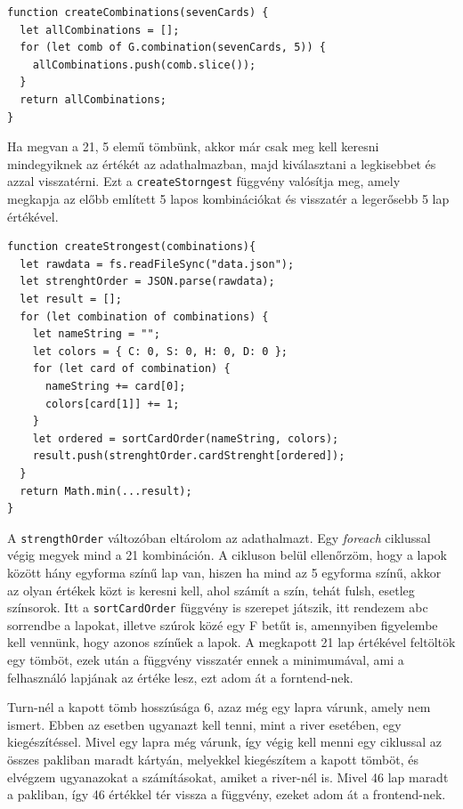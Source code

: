 \newpage

\begin{lstlisting}[style=htmlcssjs]
function createCombinations(sevenCards) {
  let allCombinations = [];
  for (let comb of G.combination(sevenCards, 5)) {
    allCombinations.push(comb.slice());
  }
  return allCombinations;
}
\end{lstlisting}

Ha megvan a 21, 5 elemű tömbünk, akkor már csak meg kell keresni mindegyiknek az értékét az adathalmazban, majd kiválasztani a legkisebbet és azzal visszatérni. Ezt a \texttt{createStorngest} függvény valósítja meg, amely megkapja az előbb említett 5 lapos kombinációkat és visszatér a legerősebb 5 lap értékével.

\begin{lstlisting}[style=htmlcssjs]
function createStrongest(combinations){
  let rawdata = fs.readFileSync("data.json");
  let strenghtOrder = JSON.parse(rawdata);
  let result = [];
  for (let combination of combinations) {
    let nameString = "";
    let colors = { C: 0, S: 0, H: 0, D: 0 };
    for (let card of combination) {
      nameString += card[0];
      colors[card[1]] += 1;
    }
    let ordered = sortCardOrder(nameString, colors);
    result.push(strenghtOrder.cardStrenght[ordered]);
  }
  return Math.min(...result);
}
\end{lstlisting}

A \texttt{strengthOrder} változóban eltárolom az adathalmazt. Egy \textit{foreach} ciklussal végig megyek mind a 21 kombináción. A cikluson belül ellenőrzöm, hogy a lapok között hány egyforma színű lap van, hiszen ha mind az 5 egyforma színű, akkor az olyan értékek közt is keresni kell, ahol számít a szín, tehát fulsh, esetleg színsorok. Itt a \texttt{sortCardOrder} függvény is szerepet játszik, itt rendezem abc sorrendbe a lapokat, illetve szúrok közé egy F betűt is, amennyiben figyelembe kell vennünk, hogy azonos színűek a lapok. A megkapott 21 lap értékével feltöltök egy tömböt, ezek után a függvény visszatér ennek a minimumával, ami a felhasználó lapjának az értéke lesz, ezt adom át a forntend-nek.

Turn-nél a kapott tömb hosszúsága 6, azaz még egy lapra várunk, amely nem ismert. Ebben az esetben ugyanazt kell tenni, mint a river esetében, egy kiegészítéssel. Mivel egy lapra még várunk, így végig kell menni egy ciklussal az összes pakliban maradt kártyán, melyekkel kiegészítem a kapott tömböt, és elvégzem ugyanazokat a számításokat, amiket a river-nél is. Mivel 46 lap maradt a pakliban, így 46 értékkel tér vissza a függvény, ezeket adom át a frontend-nek.

